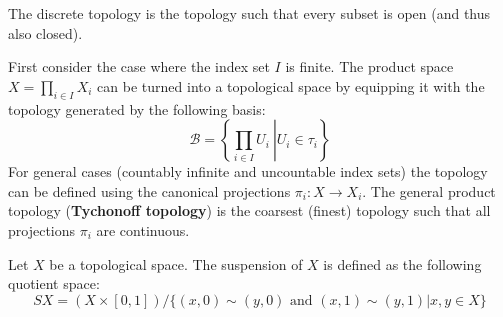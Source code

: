 
	\begin{example}
		The discrete topology is the topology such that every subset is open (and thus also closed).
	\end{example}
	
	\begin{example}\label{topology:tychonoff_topology}
		First consider the case where the index set $I$ is finite. The product space $X = \prod_{i\in I}X_i$ can be turned into a topological space by equipping it with the topology generated by the following basis:
		\begin{equation}
			\mathcal{B} = \left\{\left.\prod_{i\in I}U_i\ \right|U_i\in\tau_i\right\}
		\end{equation}
		For general cases (countably infinite and uncountable index sets) the topology can be defined using the canonical projections $\pi_i:X\rightarrow X_i$. The general product topology (\textbf{Tychonoff topology}) is the coarsest (finest) topology such that all projections $\pi_i$ are continuous.
	\end{example}
	
	
	
	\begin{construct}[Suspension]
		Let $X$ be a topological space. The suspension of $X$ is defined as the following quotient space:
		\begin{equation}
			\label{topology:suspension}
			SX = 	(X\times [0, 1])/\{(x, 0) \sim (y, 0)\text{ and }(x, 1) \sim (y, 1)|x, y\in X\}
		\end{equation}
	\end{construct}
	
